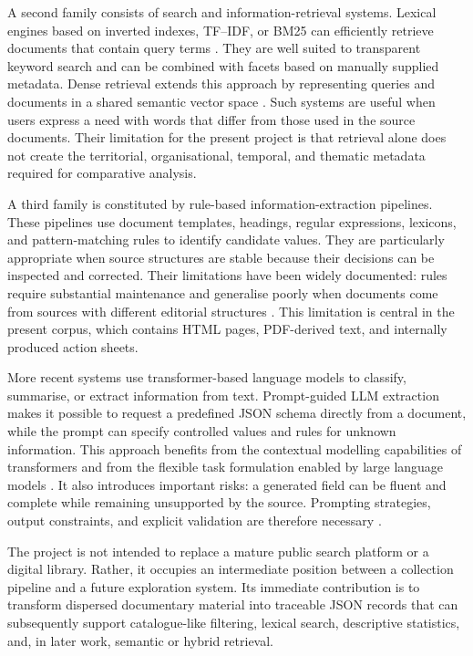 \documentclass[
11pt,
english,
singlespacing,
headsepline,
]{MastersDoctoralThesis}
\begin{document}
A second family consists of search and information-retrieval systems. Lexical
engines based on inverted indexes, TF--IDF, or BM25 can efficiently retrieve
documents that contain query terms \citep{salton1988term,robertson2009probabilistic}.
They are well suited to transparent keyword search and can be combined with
facets based on manually supplied metadata. Dense retrieval extends this
approach by representing queries and documents in a shared semantic vector
space \citep{karpukhin2020dense}. Such systems are useful when users express a
need with words that differ from those used in the source documents. Their
limitation for the present project is that retrieval alone does not create the
territorial, organisational, temporal, and thematic metadata required for
comparative analysis.

A third family is constituted by rule-based information-extraction pipelines.
These pipelines use document templates, headings, regular expressions,
lexicons, and pattern-matching rules to identify candidate values. They are
particularly appropriate when source structures are stable because their
decisions can be inspected and corrected. Their limitations have been widely
documented: rules require substantial maintenance and generalise poorly when
documents come from sources with different editorial structures
\citep{sarawagi2008information,grishman2019information}. This limitation is
central in the present corpus, which contains HTML pages, PDF-derived text, and
internally produced action sheets.

More recent systems use transformer-based language models to classify,
summarise, or extract information from text. Prompt-guided LLM extraction makes
it possible to request a predefined JSON schema directly from a document, while
the prompt can specify controlled values and rules for unknown information.
This approach benefits from the contextual modelling capabilities of
transformers \citep{vaswani2017attention,devlin2019bert} and from the flexible
task formulation enabled by large language models \citep{brown2020language}.
It also introduces important risks: a generated field can be fluent and
complete while remaining unsupported by the source. Prompting strategies,
output constraints, and explicit validation are therefore necessary
\citep{liu2023pre}.

The project is not intended to replace a mature public search platform or a
digital library. Rather, it occupies an intermediate position between a
collection pipeline and a future exploration system. Its immediate contribution
is to transform dispersed documentary material into traceable JSON records that
can subsequently support catalogue-like filtering, lexical search, descriptive
statistics, and, in later work, semantic or hybrid retrieval.
\end{document}
